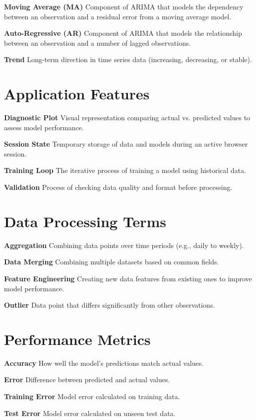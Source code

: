 \textbf{Moving Average (MA)}
Component of ARIMA that models the dependency between an observation and a residual error from a moving average model.

\textbf{Auto-Regressive (AR)}
Component of ARIMA that models the relationship between an observation and a number of lagged observations.

\textbf{Trend}
Long-term direction in time series data (increasing, decreasing, or stable).

\section{Application Features}

\textbf{Diagnostic Plot}
Visual representation comparing actual vs. predicted values to assess model performance.

\textbf{Session State}
Temporary storage of data and models during an active browser session.

\textbf{Training Loop}
The iterative process of training a model using historical data.

\textbf{Validation}
Process of checking data quality and format before processing.

\section{Data Processing Terms}

\textbf{Aggregation}
Combining data points over time periods (e.g., daily to weekly).

\textbf{Data Merging}
Combining multiple datasets based on common fields.

\textbf{Feature Engineering}
Creating new data features from existing ones to improve model performance.

\textbf{Outlier}
Data point that differs significantly from other observations.

\section{Performance Metrics}

\textbf{Accuracy}
How well the model's predictions match actual values.

\textbf{Error}
Difference between predicted and actual values.

\textbf{Training Error}
Model error calculated on training data.

\textbf{Test Error}
Model error calculated on unseen test data.

